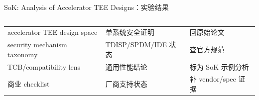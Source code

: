 \begin{frame}[t,shrink=6]{SoK: Analysis of Accelerator TEE Designs：实验结果}
\begin{columns}[T,totalwidth=\textwidth]
\begin{column}{0.49\textwidth}
{\begin{minipage}[t]{0.97\linewidth}
\begin{minipage}{0.92\linewidth}
{\begin{tabularx}{\linewidth}{@{}YYY@{}}
\midrule
accelerator TEE design space & 单系统安全证明 & 回原始论文 \\
security mechanism taxonomy & TDISP/SPDM/IDE 状态 & 查官方规范 \\
TCB/compatibility lens & 通用性能结论 & 标为 SoK 示例分析 \\
商业 checklist & 厂商支持状态 & 补 vendor/spec 证据 \\
\bottomrule
\end{tabularx}
}
    \end{minipage}
    \vspace{1mm}
  \end{minipage}}
  \end{column}
\end{columns}
\end{frame}


